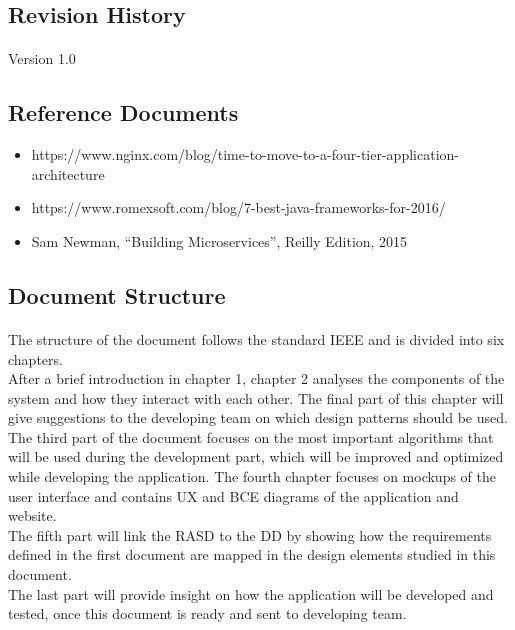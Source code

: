 \documentclass{article}
\begin{document}
		\subsection{Revision History}
			\paragraph{}Version 1.0
		\subsection{Reference Documents}
			\begin{itemize}
			\item{}https://www.nginx.com/blog/time-to-move-to-a-four-tier-application-architecture
			\item{}https://www.romexsoft.com/blog/7-best-java-frameworks-for-2016/
			\item{}Sam Newman, “Building Microservices”, Reilly Edition, 2015 
			\end{itemize}
		\newpage
		\subsection{Document Structure}
			\paragraph{}The structure of the document follows the standard IEEE and is divided into six chapters.\\
After a brief introduction in chapter 1, chapter 2 analyses the components of the system and how they interact with each other. The final part of this chapter will give suggestions to the developing team on which design patterns should be used.\\
The third part of the document focuses on the most important algorithms that will be used during the development part, which will be improved and optimized while developing the application.
The fourth chapter focuses on mockups of the user interface and contains UX and BCE diagrams of the application and website.\\
The fifth part will link the RASD to the DD by showing how the requirements defined in the first document are mapped in the design elements studied in this document.\\
The last part will provide insight on how the application will be developed and tested, once this document is ready and sent to developing team.

		\newpage
\end{document}
